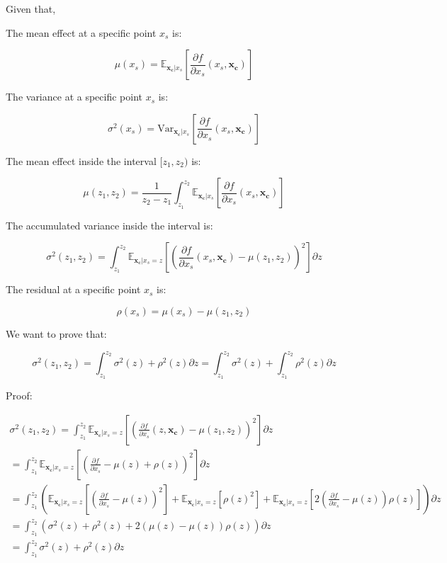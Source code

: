 \documentclass[twoside]{article}
\newcommand{\dfdx}{\frac{\partial f}{\partial x_s}}
\newcommand{\xc}{\mathbf{x_c}}
\begin{document}
Given that,

The mean effect at a specific point \(x_s\) is:

\begin{equation}
  \label{eq:3}
  \mu(x_s) = \mathbb{E}_{\xc|x_s}\left [\dfdx (x_s, \xc) \right ]
\end{equation}


The variance at a specific point \(x_s\) is:

\begin{equation}
  \label{eq:3}
  \sigma^2(x_s) = \mathrm{Var}_{\xc|x_s}\left [\dfdx (x_s, \xc) \right ]
\end{equation}


The mean effect inside the interval \([z_1, z_2)\) is:

\begin{equation}
  \label{eq:1}
  \mu(z_1, z_2) = \frac{1}{z_2-z_1} \int_{z_1}^{z_2} \mathbb{E}_{\xc|x_s}\left [\dfdx (x_s, \xc)\right ]
\end{equation}

The accumulated variance inside the interval is:

\begin{equation}
  \label{eq:2}
  \sigma^2(z_1, z_2) = \int_{z_1}^{z_2} \mathbb{E}_{\xc|x_s=z} \left [ \left ( \frac{\partial f}{\partial x_s}(x_s, \xc) - \mu(z_1, z_2) \right )^2 \right] \partial z
\end{equation}


The residual at a specific point \(x_s\) is:

\begin{equation}
  \label{eq:4}
  \rho(x_s) = \mu(x_s) - \mu(z_1, z_2)
\end{equation}


We want to prove that:

\begin{equation}
  \label{eq:5}
  \sigma^2(z_1, z_2) = \int_{z_1}^{z_2} \sigma^2(z) + \rho^2(z) \partial z
  = \int_{z_1}^{z_2} \sigma^2(z) + \int_{z_1}^{z_2} \rho^2(z) \partial z
\end{equation}

Proof:


\begin{gather}
  \sigma^2(z_1, z_2) = \int_{z_1}^{z_2} \mathbb{E}_{\xc|x_s=z} \left [ \left( \frac{\partial f}{\partial x_s}( z, \xc) - \mu(z_1, z_2) \right)^2 \right] \partial z \\
  = \int_{z_1}^{z_2} \mathbb{E}_{\xc|x_s=z} \left [ \left ( \frac{\partial f}{\partial x_s} - \mu(z) + \rho(z) \right )^2 \right] \partial z \\
  = \int_{z_1}^{z_2} \left(
  \mathbb{E}_{\xc|x_s=z} \left [ (\frac{\partial f}{\partial x_s} - \mu(z) )^2 \right ]  +
  \mathbb{E}_{\xc|x_s=z} \left [ \rho(z)^2 \right] +
  \mathbb{E}_{\xc|x_s=z} \left [ 2(\frac{\partial f}{\partial x_s} - \mu(z) )\rho(z) \right ] \right )  \partial z \\
  = \int_{z_1}^{z_2}(\sigma^2(z) + \rho^2(z) + 2(\mu(z)-\mu(z))\rho(z))\partial z \\
  = \int_{z_1}^{z_2} \sigma^2(z)  + \rho^2(z) \partial z \\
\end{gather}
\end{document}
